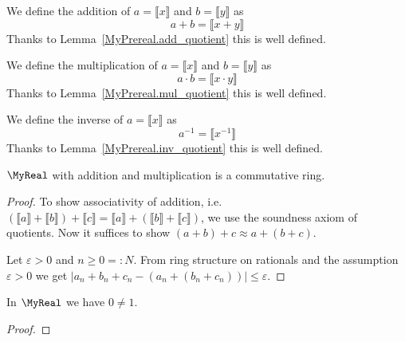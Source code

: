 \begin{definition}
    \label{MyReal.add}
    \leanok
We define the addition of $a = ⟦ x ⟧$ and $b = ⟦ y ⟧$ as
\[
a + b = ⟦ x+y ⟧
\]
Thanks to Lemma~\ref{MyPrereal.add_quotient} this is well defined.
\end{definition}

\begin{definition}
    \label{MyReal.mul}
    \leanok
We define the multiplication of $a = ⟦ x ⟧$ and $b = ⟦ y ⟧$ as
\[
a \cdot b = ⟦ x \cdot y ⟧
\]
Thanks to Lemma~\ref{MyPrereal.mul_quotient} this is well defined.
\end{definition}

\begin{definition}
    \label{MyReal.inv}
    \leanok
We define the inverse of $a = ⟦ x ⟧$ as
\[
a^{-1} = ⟦ x^{-1} ⟧
\]
Thanks to Lemma~\ref{MyPrereal.inv_quotient} this is well defined.
\end{definition}

\begin{proposition}
    \label{MyReal.commRing}
    \leanok
    $\MyReal$ with addition and multiplication is a commutative ring.
\end{proposition}
\begin{proof}
    \leanok
    To show associativity of addition, i.e. $(⟦ a ⟧ + ⟦ b ⟧) + ⟦ c ⟧ = ⟦ a ⟧ + (⟦ b ⟧ + ⟦ c ⟧)$, we use the soundness axiom of quotients.
    Now it suffices to show $(a + b) + c \approx a + (b + c)$.

    Let $\varepsilon > 0$ and $n \geq 0 =: N$.
    From ring structure on rationals and the assumption $\varepsilon > 0$ we get $|a_n + b_n + c_n - (a_n + (b_n + c_n))| \leq \varepsilon$.
\end{proof}

\begin{lemma}
    \label{MyReal.zero_ne_one}
    \leanok
In $\MyReal$ we have $0 \neq 1$.
\end{lemma}
\begin{proof}
    \leanok
\end{proof}

